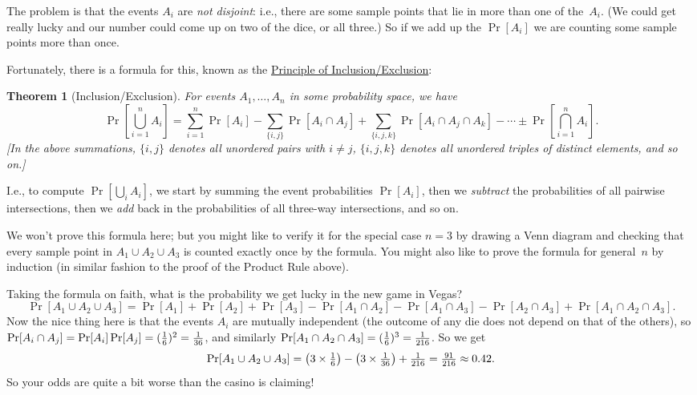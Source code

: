 \documentclass[11pt]{article}
\def\ul#1{\underline{#1}}
\newcounter{thm}
\newtheorem{theorem}{Theorem}[thm]
\begin{document}
The problem is that the events $A_i$ are {\it not disjoint\/}: i.e.,
there are some sample points that lie in more than one of the~$A_i$.
(We could get really lucky and our number could come up on two
of the dice, or all three.)  So if we add up the $\Pr[A_i]$ we
are counting some sample points more than once.

Fortunately, there is a formula for this,
known as the \ul{Principle of Inclusion/Exclusion}:

\begin{theorem}[Inclusion/Exclusion]
For events $A_1,\ldots,A_n$ in some probability space, we have $$
   \Pr[{\textstyle\bigcup_{i=1}^n A_i}] = \sum_{i=1}^n \Pr[A_i]
                             -\sum_{\{i,j\}} \Pr[A_i\cap A_j]
                             +\sum_{\{i,j,k\}} \Pr[A_i\cap A_j\cap A_k]
                             -\cdots\pm \Pr[{\textstyle\bigcap_{i=1}^n A_i}].  $$
[In the above summations, $\{i,j\}$ denotes all unordered pairs
with $i\ne j$, $\{i,j,k\}$ denotes all unordered triples of distinct
elements, and so on.]
\end{theorem}

I.e., to compute $\Pr[\bigcup_i A_i]$, we start by summing the event
probabilities $\Pr[A_i]$, then we {\it subtract\/} the probabilities
of all pairwise intersections, then we {\it add\/} back in the probabilities
of all three-way intersections, and so on.

We won't prove this formula here; but you might like to verify it
for the special case $n=3$ by drawing a Venn diagram and checking
that every sample point in $A_1\cup A_2\cup A_3$ is counted exactly
once by the formula.  You might also like to prove the formula for
general~$n$ by induction (in similar fashion to the proof of the Product
Rule above).

Taking the formula on faith, what is the
probability we get lucky in the new game in Vegas?  $$
  \Pr[A_1\cup A_2\cup A_3] = \Pr[A_1]+\Pr[A_2]+\Pr[A_3]
                  -\Pr[A_1\cap A_2] -\Pr[A_1\cap A_3] -\Pr[A_2\cap A_3]
                                +\Pr[A_1\cap A_2\cap A_3].  $$
Now the nice thing here is that the events $A_i$ are mutually
independent (the outcome of any die does not depend on that of the
others), so $\Pr[A_i\cap A_j]=\Pr[A_i]\Pr[A_j] = ({1\over 6})^2={1\over{36}}$,
and similarly $\Pr[A_1\cap A_2\cap A_3]=({1\over 6})^3={1\over{216}}$.
So we get $$
  \Pr[A_1\cup A_2\cup A_3] = {\textstyle \left(3\times{1\over 6}\right) -
                                         \left(3\times{1\over {36}}\right) +
                                         {1\over{216}} =
                                             {{91}\over{216}}\approx 0.42}. $$
So your odds are quite a bit worse than the casino is claiming!
\end{document}
